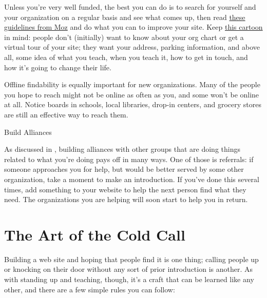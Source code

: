 Unless you're very well funded, the best you can do is to search for
yourself and your organization on a regular basis and see what comes
up, then read \href{https://moz.com/learn/seo/on-page-factors}{these
  guidelines from Moz} and do what you can to improve your site. Keep
\href{https://xkcd.com/773/}{this cartoon} in mind: people don't
(initially) want to know about your org chart or get a virtual tour of
your site; they want your address, parking information, and above all,
some idea of what you teach, when you teach it, how to get in touch,
and how it's going to change their life.

Offline findability is equally important for new organizations. Many
of the people you hope to reach might not be online as often as you,
and some won't be online at all.  Notice boards in schools, local
libraries, drop-in centers, and grocery stores are still an effective
way to reach them.

\begin{callout}{Build Alliances}

  As discussed in , building alliances with other
  groups that are doing things related to what you're doing pays off
  in many ways. One of those is referrals: if someone approaches you
  for help, but would be better served by some other organization,
  take a moment to make an introduction. If you've done this several
  times, add something to your website to help the next person find
  what they need. The organizations you are helping will soon start to
  help you in return.

\end{callout}

\section{The Art of the Cold Call}\label{s:marketing-cold-call}

Building a web site and hoping that people find it is one thing;
calling people up or knocking on their door without any sort of prior
introduction is another. As with standing up and teaching, though,
it's a craft that can be learned like any other, and there are a few
simple rules you can follow:

